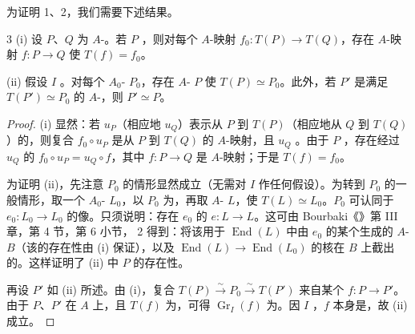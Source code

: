 为证明 1、2，我们需要下述结果。
\begin{SGAresult}{}{3}
(i) 设 $P$、$Q$ 为 $A$-。若 $P$ ，则对每个 $A$-映射 $f_0:T(P)\to T(Q)$，存在 $A$-映射 $f:P\to Q$ 使 $T(f)=f_0$。

(ii) 假设 $I$ 。对每个 $A_0$- $P_0$，存在 $A$- $P$ 使 $T(P)\simeq P_0$。此外，若 $P'$ 是满足 $T(P')\simeq P_0$ 的 $A$-，则 $P'\simeq P$。
\end{SGAresult}
\begin{proof}
(i) 显然：若 $u_P$（相应地 $u_Q$）表示从 $P$ 到 $T(P)$（相应地从 $Q$ 到 $T(Q)$）的，则复合 $f_0\circ u_P$ 是从 $P$ 到 $T(Q)$ 的 $A$-映射，且 $u_Q$ 。由于 $P$ ，存在经过 $u_Q$ 的 $f_0\circ u_P=u_Q\circ f$，其中 $f:P\to Q$ 是 $A$-映射；于是 $T(f)=f_0$。

为证明 (ii)，先注意 $P_0$ 的情形显然成立（无需对 $I$ 作任何假设）。为转到 $P_0$ 的一般情形，取一个 $A_0$-
$L_0$，以 $P_0$ 为，再取 $A$- $L$，使 $T(L)\simeq L_0$。$P_0$ 可认同于 $e_0:L_0\to L_0$ 的像。只须说明：存在 $e_0$ 的 $e:L\to L$。这可由 Bourbaki《》第 III 章，第 4 节，第 6 小节， 2 得到：将该用于 $\operatorname{End}(L)$ 中由 $e_0$ 的某个生成的 $A$- $B$（该的存在性由 (i) 保证），以及 $\operatorname{End}(L)\to\operatorname{End}(L_0)$ 的核在 $B$ 上截出的。这样证明了 (ii) 中 $P$ 的存在性。

再设 $P'$ 如 (ii) 所述。由 (i)，复合 $T(P)\xrightarrow{\sim}P_0\xrightarrow{\sim}T(P')$ 来自某个 $f:P\to P'$。由于 $P$、$P'$ 在 $A$ 上，且 $T(f)$ 为，可得 $\operatorname{Gr}_I(f)$ 为。因 $I$ ，$f$ 本身是，故 (ii) 成立。
\end{proof}
